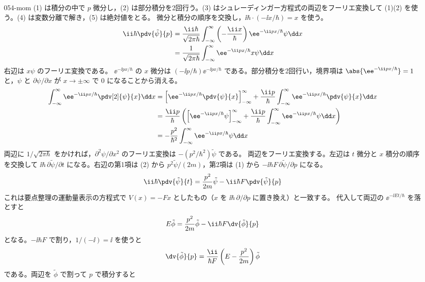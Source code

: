 \documentclass[uplatex,dvipdfmx,a4paper,11pt]{jsarticle}
\begin{document}
\begin{kaisetsu}{054-mom}
\houshin (1) は積分の中で $p$ 微分し，(2) は部分積分を2回行う。(3) はシュレーディンガー方程式の両辺をフーリエ変換して (1)(2) を使う。(4) は変数分離で解き，(5) は絶対値をとる。
\keisan {} 微分と積分の順序を交換し，$\ii\hbar\cdot(-\ii x/\hbar)=x$ を使う。
\begin{align*}
\ii\hbar\pdv{\tilde{\psi}}{p}
&=\frac{\ii\hbar}{\sqrt{2\pi\hbar}}\int_{-\infty}^{\infty}\left(-\frac{\ii x}{\hbar}\right)\ee^{-\ii px/\hbar}\psi\dd x\\
&=\frac{1}{\sqrt{2\pi\hbar}}\int_{-\infty}^{\infty}\ee^{-\ii px/\hbar}x\psi\dd x
\end{align*}
右辺は $x\psi$ のフーリエ変換である。
 $\ee^{-\ii px/\hbar}$ の $x$ 微分は $(-\ii p/\hbar)\ee^{-\ii px/\hbar}$ である。部分積分を2回行い，境界項は $\abs{\ee^{-\ii px/\hbar}}=1$ と，$\psi$ と $\partial\psi/\partial x$ が $x\to\pm\infty$ で $0$ になることから消える。
\begin{align*}
\int_{-\infty}^{\infty}\ee^{-\ii px/\hbar}\pdv[2]{\psi}{x}\dd x
&=\Bigl[\ee^{-\ii px/\hbar}\pdv{\psi}{x}\Bigr]_{-\infty}^{\infty}+\frac{\ii p}{\hbar}\int_{-\infty}^{\infty}\ee^{-\ii px/\hbar}\pdv{\psi}{x}\dd x\\
&=\frac{\ii p}{\hbar}\left(\Bigl[\ee^{-\ii px/\hbar}\psi\Bigr]_{-\infty}^{\infty}+\frac{\ii p}{\hbar}\int_{-\infty}^{\infty}\ee^{-\ii px/\hbar}\psi\dd x\right)\\
&=-\frac{p^{2}}{\hbar^{2}}\int_{-\infty}^{\infty}\ee^{-\ii px/\hbar}\psi\dd x
\end{align*}
両辺に $1/\sqrt{2\pi\hbar}$ をかければ，$\partial^{2}\psi/\partial x^{2}$ のフーリエ変換は $-(p^{2}/\hbar^{2})\tilde{\psi}$ である。
 両辺をフーリエ変換する。左辺は $t$ 微分と $x$ 積分の順序を交換して $\ii\hbar\,\partial\tilde{\psi}/\partial t$ になる。右辺の第1項は (2) から $p^{2}\tilde{\psi}/(2m)$，第2項は (1) から $-\ii\hbar F\,\partial\tilde{\psi}/\partial p$ になる。
\[ \ii\hbar\pdv{\tilde{\psi}}{t}=\frac{p^{2}}{2m}\tilde{\psi}-\ii\hbar F\pdv{\tilde{\psi}}{p} \]
これは要点整理の運動量表示の方程式で $V(x)=-Fx$ としたもの（$x$ を $\ii\hbar\,\partial/\partial p$ に置き換え）と一致する。
 代入して両辺の $\ee^{-\ii Et/\hbar}$ を落とすと
\[ E\tilde{\phi}=\frac{p^{2}}{2m}\tilde{\phi}-\ii\hbar F\dv{\tilde{\phi}}{p} \]
となる。$-\ii\hbar F$ で割り，$1/(-\ii)=\ii$ を使うと
\[ \dv{\tilde{\phi}}{p}=\frac{\ii}{\hbar F}\left(E-\frac{p^{2}}{2m}\right)\tilde{\phi} \]
である。両辺を $\tilde{\phi}$ で割って $p$ で積分すると

\end{kaisetsu}
\end{document}
